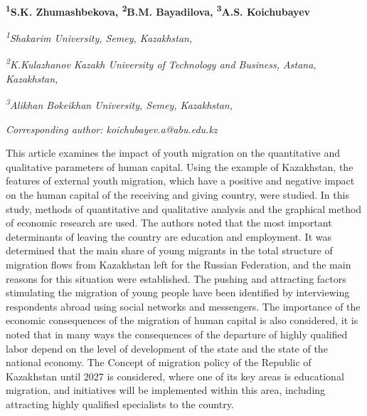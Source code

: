 
\begin{articleheader}

{\bfseries
\textsuperscript{1}S.K. Zhumashbekova\authorid,
\textsuperscript{2}B.M. Bayadilova\authorid,
\textsuperscript{3}A.S. Koichubayev\textsuperscript{\envelope } \authorid}
\end{articleheader}

\begin{affiliation}
\emph{\textsuperscript{1}Shakarim University, Semey, Kazakhstan,}

\emph{\textsuperscript{2}K.Kulazhanov Kazakh University of Technology and Business, Astana, Kazakhstan,}

\emph{\textsuperscript{3}Alikhan Bokeikhan University, Semey, Kazakhstan,}

\raggedright \textsuperscript{\envelope }{\em Corresponding author: koichubayev.a@abu.edu.kz}
\end{affiliation}

This article examines the impact of youth migration on the quantitative
and qualitative parameters of human capital. Using the example of
Kazakhstan, the features of external youth migration, which have a
positive and negative impact on the human capital of the receiving and
giving country, were studied. In this study, methods of quantitative and
qualitative analysis and the graphical method of economic research are
used. The authors noted that the most important determinants of leaving
the country are education and employment. It was determined that the
main share of young migrants in the total structure of migration flows
from Kazakhstan left for the Russian Federation, and the main reasons
for this situation were established. The pushing and attracting factors
stimulating the migration of young people have been identified by
interviewing respondents abroad using social networks and messengers.
The importance of the economic consequences of the migration of human
capital is also considered, it is noted that in many ways the
consequences of the departure of highly qualified labor depend on the
level of development of the state and the state of the national economy.
The Concept of migration policy of the Republic of Kazakhstan until 2027
is considered, where one of its key areas is educational migration, and
initiatives will be implemented within this area, including attracting
highly qualified specialists to the country.

